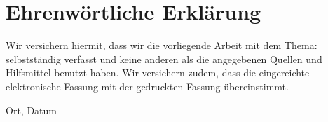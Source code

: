 
\clearpage
\chapter*{Ehrenwörtliche Erklärung}

Wir versichern hiermit, dass wir die vorliegende Arbeit
 mit dem Thema: \textit{\DerTitelDerArbeit} selbstständig verfasst und keine anderen als die angegebenen Quellen und
Hilfsmittel benutzt haben. Wir versichern zudem,
dass die eingereichte elektronische Fassung mit der gedruckten Fassung übereinstimmt.

\vspace{2cm}
Ort, Datum

\vspace{5mm}
\authorSG
\hfill \authorRF
\hfill \authorGP

\vspace{5mm}
\hfill \authorRF
\hfill \authorNL
\hfill